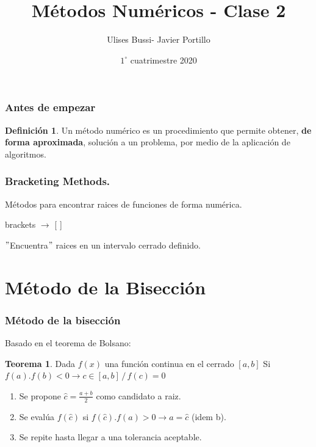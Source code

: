 \documentclass[xcolor=svgnames]{beamer} %
\title{Métodos Numéricos - Clase 2}
\author{Ulises Bussi- Javier Portillo}
\date{ $1^\circ$ cuatrimestre 2020}
\theoremstyle{plain}
\renewcommand{\textbf}[1]{{\bfseries\textcolor{redUnq2}{#1}}}
\theoremstyle{definition}
\newtheorem{defi}{Definición}
\newtheorem{teor}{Teorema}
\begin{document}
 


\begin{frame} %
	\titlepage
\end{frame}


\begin{frame}
\frametitle{Antes de empezar}
\begin{tcolorbox}
	\begin{defi} \vspace{15pt}

		Un método numérico es un procedimiento que permite obtener, \textbf{de forma aproximada}, solución a un problema, por medio de la aplicación de algoritmos.
	\end{defi}
\end{tcolorbox}


\end{frame}

\begin{frame}
\frametitle{Bracketing Methods.}

Métodos para encontrar raices de funciones de forma numérica.\vspace{10pt}


\begin{tcolorbox}
  \begin{center}
    brackets $\rightarrow$ [ ]
  \end{center}
\end{tcolorbox} \vspace{20pt}
\pause


$"$Encuentra$"$ raices en un intervalo cerrado definido.



\end{frame}

\section{Método de la Bisección}
\begin{frame}
\frametitle{Método de la bisección}

Basado en el teorema de Bolsano:

\begin{tcolorbox}
\begin{teor}
	Dada $f(x)$ una función continua en el cerrado $[a,b]$ Si $f(a).f(b)<0 \rightarrow c \in [a,b]\, /\, f(c)=0$

\end{teor}
\end{tcolorbox}\vspace{12pt}

\begin{enumerate}
  \item Se propone $\hat c = \frac{a+b}{2} $ como candidato a raiz.
  \item Se evalúa $f(\hat c)$ si $f(\hat c).f(a)>0 \rightarrow  a=\hat c$ (idem b). 
  \item  Se repite hasta llegar a una tolerancia aceptable.
\end{enumerate}

\end{frame}
\end{document}
